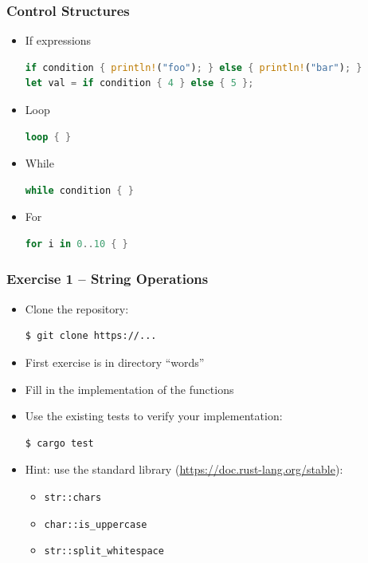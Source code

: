 \begin{frame}[fragile]
    \frametitle{Control Structures}

    \begin{itemize}
        \item If expressions
    \begin{lstlisting}[language=rust]
if condition { println!("foo"); } else { println!("bar"); }
let val = if condition { 4 } else { 5 };
    \end{lstlisting}
        \item Loop
    \begin{lstlisting}[language=rust]
loop { }
    \end{lstlisting}
        \item While
    \begin{lstlisting}[language=rust]
while condition { }
    \end{lstlisting}
        \item For
    \begin{lstlisting}[language=rust]
for i in 0..10 { }
    \end{lstlisting}
    \end{itemize}
\end{frame}

\begin{frame}[fragile]
    \frametitle{Exercise 1 -- String Operations}

    \begin{itemize}
        \item Clone the repository:
    \begin{lstlisting}[language=bash]
$ git clone https://...
    \end{lstlisting}
        \item First exercise is in directory ``words''
        \item Fill in the implementation of the functions
        \item Use the existing tests to verify your implementation:
    \begin{lstlisting}[language=bash]
$ cargo test
    \end{lstlisting}
        \item Hint: use the standard library (\url{https://doc.rust-lang.org/stable}):
        \begin{itemize}
            \item \texttt{str::chars}
            \item \texttt{char::is\_uppercase}
            \item \texttt{str::split\_whitespace}
        \end{itemize}
    \end{itemize}
\end{frame}
